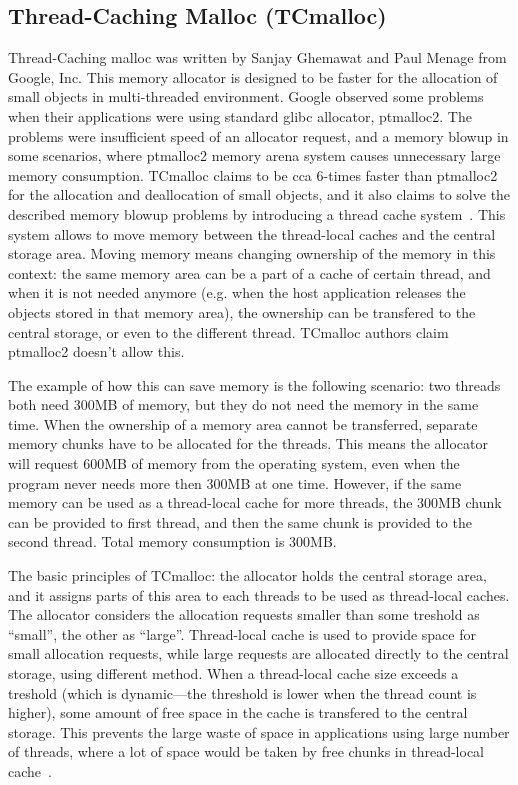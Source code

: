 \subsection{Thread-Caching Malloc (TCmalloc)}
Thread-Caching malloc was written by Sanjay Ghemawat and Paul Menage from
Google, Inc. This memory allocator is designed to be faster for the allocation
of small objects in multi-threaded environment. Google observed some problems
when their applications were using standard glibc allocator, ptmalloc2. The
problems were insufficient speed of an allocator request, and a memory blowup
in some scenarios, where ptmalloc2 memory arena system causes unnecessary large
memory consumption. TCmalloc claims to be cca 6-times faster than ptmalloc2 for
the allocation and deallocation of small objects, and it also claims to solve
the described memory blowup problems by introducing a thread cache
system~\cite{allocators:tcmalloc}. This system allows to move memory between the
thread-local caches and the central storage area. Moving memory means changing ownership of the memory in
this context: the same memory area can be a part of a cache of certain thread, and
when it is not needed anymore (e.g. when the host application releases the
objects stored in that memory area), the ownership can be transfered to the
central storage, or even to the different thread. TCmalloc authors claim
ptmalloc2 doesn't allow this.

The example of how this can save memory is the following scenario: two threads
both need 300MB of memory, but they do not need the memory in the same time.
When the ownership of a memory area cannot be transferred, separate memory
chunks have to be allocated for the threads. This means the allocator will
request 600MB of memory from the operating system, even when the program never
needs more then 300MB at one time. However, if the same memory can be used as a
thread-local cache for more threads, the 300MB chunk can be provided to first
 thread, and then the same chunk is provided to the second thread. Total memory
consumption is 300MB.

The basic principles of TCmalloc: the allocator holds the central storage area,
and it assigns parts of this area to each threads to be used as thread-local
caches. The allocator considers the allocation requests smaller than some
treshold as ``small'', the other as ``large''. Thread-local cache is used to
provide space for small allocation requests, while large requests are allocated
directly to the central storage, using different method. When a thread-local
cache size exceeds a treshold (which is dynamic---the threshold is lower when
the thread count is higher), some amount of free space in the cache is
transfered to the central storage. This prevents the large waste of space in
applications using large number of threads, where a lot of space would be taken
by free chunks in thread-local cache~\cite{allocators:tcmalloc}.

